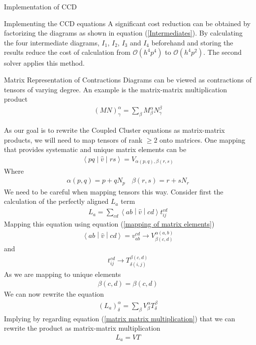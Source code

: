 \documentclass[twoside,english]{uiofysmaster}
\begin{document}
\begin{chapter}{Implementation of CCD}
\begin{section}{Implementing the CCD equations}
		A significant cost reduction can be obtained by factorizing the diagrams as shown in equation (\ref{Intermediates}). By calculating the four intermediate diagrams, $I_1$, $I_2$, $I_3$ and $I_4$ beforehand and storing the results reduce the cost of calculation from $\mathcal{O}(h^4 p^4)$ to $\mathcal{O}(h^4 p^2)$. The second solver applies this method. 

	\end{section}

	\begin{section}{Matrix Representation of Contractions}
		Diagrams can be viewed as contractions of tensors of varying degree. An example is the matrix-matrix multiplication product
		\begin{align}
		 	\left( M N \right)_{\gamma}^{\alpha} = \sum_{\beta} M_{\beta}^\alpha N_\gamma^\beta 
		 	\label{matrix matrix multiplication}
		\end{align} 

		As our goal is to rewrite the Coupled Cluster equations as matrix-matrix products, we will need to map tensors of rank $\geq 2$ onto matrices. One mapping that provides systematic and unique matrix elements can be 
		\begin{align}
			\left<pq\middle| \hat v\middle|rs\right> = V_{\alpha(p,q),\beta(r,s)}
		\end{align}
		Where 
		\begin{align}
			\alpha(p,q) = p + q N_p \;\,\:\; \beta(r,s) = r + s N_r
			\label{mapping of matrix elements}
		\end{align}
		We need to be careful when mapping tensors this way. Consider first the calculation of the perfectly aligned $L_a$ term
		\begin{align}
			L_a = \sum_{cd} \left< ab \middle| \hat v\middle|cd\right> t_{ij}^{cd}
		\end{align}
		Mapping this equation using equation (\ref{mapping of matrix elements})
		\begin{align}
			\left< ab \middle| \hat v\middle|cd\right> = v_{ab}^{cd} \rightarrow V_{\beta(c,d)}^{\alpha(a,b)}
		\end{align}
		and
		\begin{align}
			t_{ij}^{cd} \rightarrow T_{\delta(i,j)}^{\beta(c,d)}
		\end{align}
		As we are mapping to unique elements 
		\begin{align}
			\beta(c,d) = \beta(c,d)
		\end{align}
		We can now rewrite the equation 
		\begin{align}
			(L_a)_ \delta^\alpha = \sum_ \beta V_ \beta^\alpha T_ \delta^\beta
		\end{align}
		Implying by regarding equation (\ref{matrix matrix multiplication}) that we can rewrite the product as matrix-matrix multiplication 
		\begin{align}
			L_a = VT
		\end{align}


\end{section}
\end{chapter}
\end{document}
